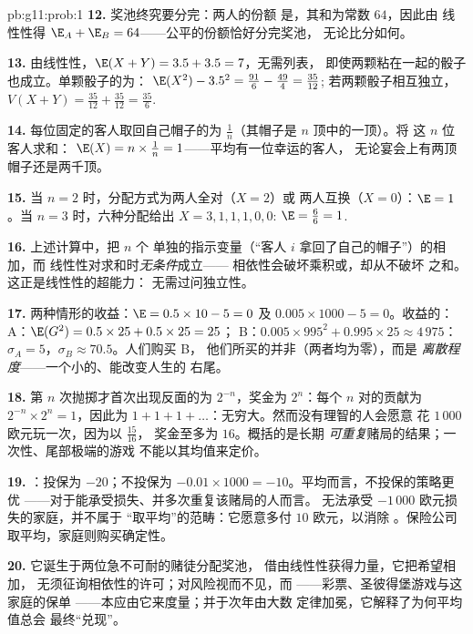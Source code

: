 \begin{solution}{pb:g11:prob:1}
\textbf{12.} 奖池终究要分完：两人的份额
是，其和为常数 $64$，因此由
线性性得 $\E_A + \E_B = 64$——公平的份额恰好分完奖池，
无论比分如何。

\textbf{13.} 由线性性，$\E(X + Y) = 3.5 + 3.5 = 7$，无需列表，
即使两颗粘在一起的骰子也成立。单颗骰子的为：
$\E(X^2) - 3.5^2 = \frac{91}{6} - \frac{49}{4} = \frac{35}{12}$;
若两颗骰子相互独立，
$V(X + Y) = \frac{35}{12} + \frac{35}{12} = \frac{35}{6}$.

\textbf{14.} 每位固定的客人取回自己帽子的为
$\frac1n$（其帽子是 $n$ 顶中的一顶）。将
这 $n$ 位客人求和：
$\E(X) = n \times \frac1n = 1$——平均有一位幸运的客人，
无论宴会上有两顶帽子还是两千顶。

\textbf{15.} 当 $n = 2$ 时，分配方式为两人全对（$X = 2$）或
两人互换（$X = 0$）：$\E = 1$。当 $n = 3$ 时，六种分配给出
$X = 3, 1, 1, 1, 0, 0$: $\E = \frac{6}{6} = 1$.

\textbf{16.} 上述计算中，把 $n$ 个
单独的指示变量（“客人 $i$ 拿回了自己的帽子”）的相加，而
线性性对求和时\emph{无条件}成立——
相依性会破坏乘积或，却从不破坏
之和。这正是线性性的超能力：
无需过问独立性。

\textbf{17.} 两种情形的收益：$\E = 0.5 \times 10 - 5 = 0$ 及
$0.005 \times 1000 - 5 = 0$。收益的：
A：$\E(G^2) = 0.5 \times 25 + 0.5 \times 25 = 25$；
B：$0.005 \times 995^2 + 0.995 \times 25 \approx 4\,975$：
$\sigma_A = 5$，$\sigma_B \approx 70.5$。人们购买 B，
他们所买的并非（两者均为零），而是
\emph{离散程度}——一个小的、能改变人生的
右尾。

\textbf{18.} 第 $n$ 次抛掷才首次出现反面的为
$2^{-n}$，奖金为 $2^n$：每个 $n$ 对的贡献为
$2^{-n} \times 2^n = 1$，因此为
$1 + 1 + 1 + \dots$：无穷大。然而没有理智的人会愿意
花 $1\,000$ 欧元玩一次，因为以 $\frac{15}{16}$，
奖金至多为 $16$。概括的是长期
\emph{可重复}赌局的结果；一次性、尾部极端的游戏
不能以其均值来定价。

\textbf{19.} ：投保为 $-20$；不投保为
$-0.01 \times 1000 = -10$。平均而言，不投保的策略更优
——对于能承受损失、并多次重复该赌局的人而言。
无法承受 $-1\,000$ 欧元损失的家庭，并不属于
“取平均”的范畴：它愿意多付 $10$ 欧元，以消除
。保险公司取平均，家庭则购买确定性。

\textbf{20.} 它诞生于两位急不可耐的赌徒分配奖池，
借由线性性获得力量，它把希望相加，
无须征询相依性的许可；对风险视而不见，而
——彩票、圣彼得堡游戏与这家庭的保单
——本应由它来度量；并于次年由大数
定律加冕，它解释了为何平均值总会
最终“兑现”。
\end{solution}
